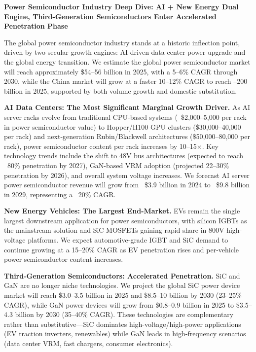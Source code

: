\textbf{Power Semiconductor Industry Deep Dive: AI + New Energy Dual Engine, Third-Generation Semiconductors Enter Accelerated Penetration Phase}

\vspace{0.5em}

The global power semiconductor industry stands at a historic inflection point, driven by two secular growth engines: AI-driven data center power upgrade and the global energy transition. We estimate the global power semiconductor market will reach approximately \$54–56 billion in 2025, with a 5–6\% CAGR through 2030, while the China market will grow at a faster 10–12\% CAGR to reach –200 billion in 2025, supported by both volume growth and domestic substitution.

\vspace{0.3em}

\textbf{AI Data Centers: The Most Significant Marginal Growth Driver.} As AI server racks evolve from traditional CPU-based systems (~\$2,000–5,000 per rack in power semiconductor value) to Hopper/H100 GPU clusters (\$30,000–40,000 per rack) and next-generation Rubin/Blackwell architectures (\$50,000–80,000 per rack), power semiconductor content per rack increases by 10–15×. Key technology trends include the shift to 48V bus architectures (expected to reach ~80\% penetration by 2027), GaN-based VRM adoption (projected 22–30\% penetration by 2026), and overall system voltage increases. We forecast AI server power semiconductor revenue will grow from ~\$3.9 billion in 2024 to ~\$9.8 billion in 2029, representing a ~20\% CAGR.

\vspace{0.3em}

\textbf{New Energy Vehicles: The Largest End-Market.} EVs remain the single largest downstream application for power semiconductors, with silicon IGBTs as the mainstream solution and SiC MOSFETs gaining rapid share in 800V high-voltage platforms. We expect automotive-grade IGBT and SiC demand to continue growing at a 15–20\% CAGR as EV penetration rises and per-vehicle power semiconductor content increases.

\vspace{0.3em}

\textbf{Third-Generation Semiconductors: Accelerated Penetration.} SiC and GaN are no longer niche technologies. We project the global SiC power device market will reach \$3.0–3.5 billion in 2025 and \$8.5–10 billion by 2030 (23–25\% CAGR), while GaN power devices will grow from \$0.8–0.9 billion in 2025 to \$3.5–4.3 billion by 2030 (35–40\% CAGR). These technologies are complementary rather than substitutive—SiC dominates high-voltage/high-power applications (EV traction inverters, renewables) while GaN leads in high-frequency scenarios (data center VRM, fast chargers, consumer electronics).

